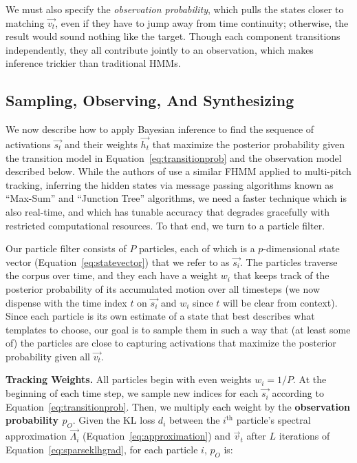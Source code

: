 \documentclass{article}
\begin{document}
    We must also specify the {\em observation probability}, which pulls the states closer to matching $\vec{v_t}$, even if they have to jump away from time continuity; otherwise, the result would sound nothing like the target.  Though each component transitions independently, they all contribute jointly to an observation, which makes inference trickier than traditional HMMs.



\subsection{Sampling, Observing, And Synthesizing}
\label{sec:sampling}

We now describe how to apply Bayesian inference to find the sequence of activations $\vec{s_t}$ and their weights $\vec{h_t}$ that maximize the posterior probability given the transition model in Equation~\ref{eq:transitionprob} and the observation model described below.  While the authors of \cite{wohlmayr2010probabilistic} use a similar FHMM applied to multi-pitch tracking, inferring the hidden states via message passing algorithms known as ``Max-Sum'' \cite{kschischang2001factor} and ``Junction Tree'' \cite{jensen1996introduction} algorithms, we need a faster technique which is also real-time, and which has tunable accuracy that degrades gracefully with restricted computational resources.  To that end, we turn to a particle filter.

Our particle filter consists of $P$ particles, each of which is a $p$-dimensional state vector (Equation~\ref{eq:statevector}) that we refer to as $\vec{s_i}$.  The particles traverse the corpus over time, and they each have a weight $w_i$ that keeps track of the posterior probability of its accumulated motion over all timesteps (we now dispense with the time index $t$ on $\vec{s_i}$ and $w_i$ since $t$ will be clear from context).  Since each particle is its own estimate of a state that best describes what templates to choose, our goal is to sample them in such a way that (at least some of) the particles are close to capturing activations that maximize the posterior probability given all $\vec{v_t}$.

\textbf{Tracking Weights.} All particles begin with even weights $w_i = 1/P$.  At the beginning of each time step, we sample new indices for each $\vec{s_i}$ according to Equation~\ref{eq:transitionprob}.  Then, we multiply each weight by the \textbf{observation probability $p_O$}.  Given the KL loss $d_i$ between the $i^{\text{th}}$ particle's spectral approximation $\vec{\Lambda_i}$ (Equation~\ref{eq:approximation}) and $\vec{v}_t$ after $L$ iterations of Equation~\ref{eq:sparseklhgrad}, for each particle $i$, $p_O$ is:
\end{document}
